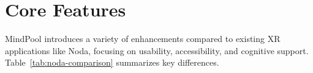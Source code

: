 \documentclass{CPP}
\begin{document}





\section{Core Features}



MindPool introduces a variety of enhancements compared to existing XR applications like Noda, focusing on usability, accessibility, and cognitive support. Table~\ref{tab:noda-comparison} summarizes key differences.
\end{document}
